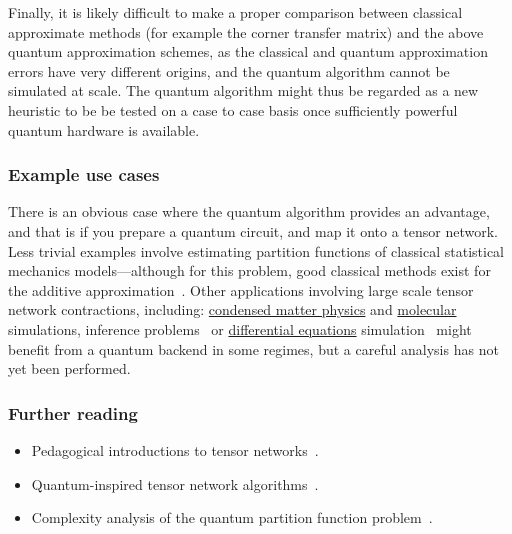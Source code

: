\begin{refsection}
Finally, it is likely difficult to make a proper comparison between classical approximate methods (for example the corner transfer matrix)  and the above quantum approximation schemes, as the classical and quantum approximation errors have very different origins, and the quantum algorithm cannot be simulated at scale. The quantum algorithm might thus be regarded as a new heuristic to be be tested on a case to case basis once sufficiently powerful quantum hardware is available. 



\subsubsection*{Example use cases}

There is an obvious case where the quantum algorithm provides an advantage, and that is if you prepare a quantum circuit, and map it onto a tensor network. 
Less trivial examples involve estimating partition functions of classical statistical mechanics models---although for this problem, good classical methods exist for the additive approximation~\cite{chowdhury2021computing}.  
Other applications involving large scale tensor network contractions, including: \hyperref[appl:CondensedMatter]{condensed matter physics} and \hyperref[appl:ElectronicStructure]{molecular} simulations, inference problems~\cite{deng2019tie} or \hyperref[appl:DiffEq]{differential equations} simulation~\cite{gourianov2022quantum}  might benefit from a quantum backend in some regimes, but a careful analysis has not yet been performed.   


\subsubsection*{Further reading}

\begin{itemize}
    \item Pedagogical introductions to tensor networks~\cite{biamonte2017tensor,orus2019tensor}.
    \item Quantum-inspired tensor network algorithms~\cite{kastoryano2022highly,patel2022quantum,felser2021quantum,otgonbaatar2023quantum}.
    \item Complexity analysis of the quantum partition function problem~\cite{bravyi2021complexity}.
\end{itemize}

\printbibliography[heading=secbib,segment=\therefsegment]

\end{refsection}
